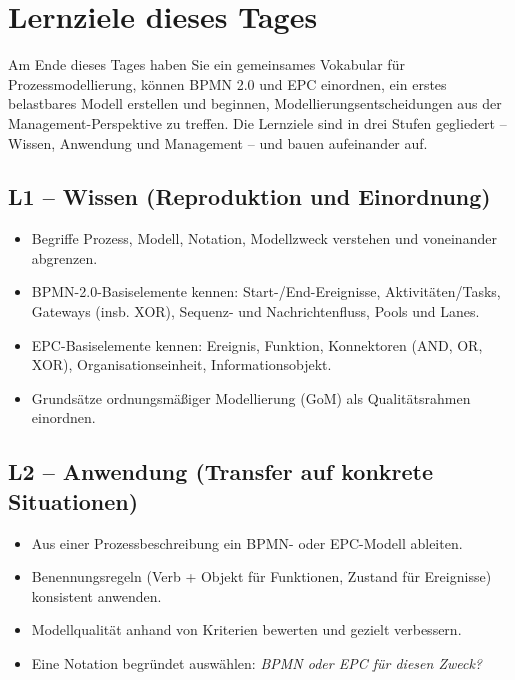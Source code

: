 \documentclass[11pt,a4paper,oneside]{article}
\begin{document}
\section*{Lernziele dieses Tages}
\thispagestyle{plain}

\noindent Am Ende dieses Tages haben Sie ein gemeinsames Vokabular für Prozessmodellierung, können BPMN 2.0 und EPC einordnen, ein erstes belastbares Modell erstellen und beginnen, Modellierungsentscheidungen aus der Management-Perspektive zu treffen. Die Lernziele sind in drei Stufen gegliedert -- Wissen, Anwendung und Management -- und bauen aufeinander auf.

\subsection*{L1 -- Wissen (Reproduktion und Einordnung)}
\begin{itemize}
  \item Begriffe Prozess, Modell, Notation, Modellzweck verstehen und voneinander abgrenzen.
  \item BPMN-2.0-Basiselemente kennen: Start-/End-Ereignisse, Aktivitäten/Tasks, Gateways (insb. XOR), Sequenz- und Nachrichtenfluss, Pools und Lanes.
  \item EPC-Basiselemente kennen: Ereignis, Funktion, Konnektoren (AND, OR, XOR), Organisationseinheit, Informationsobjekt.
  \item Grundsätze ordnungsmäßiger Modellierung (GoM) als Qualitätsrahmen einordnen.
\end{itemize}

\subsection*{L2 -- Anwendung (Transfer auf konkrete Situationen)}
\begin{itemize}
  \item Aus einer Prozessbeschreibung ein BPMN- oder EPC-Modell ableiten.
  \item Benennungsregeln (Verb + Objekt für Funktionen, Zustand für Ereignisse) konsistent anwenden.
  \item Modellqualität anhand von Kriterien bewerten und gezielt verbessern.
  \item Eine Notation begründet auswählen: \emph{BPMN oder EPC für diesen Zweck?}
\end{itemize}
\end{document}
